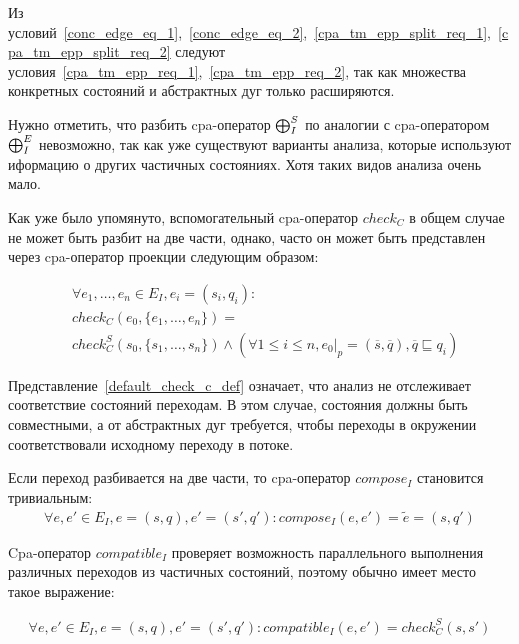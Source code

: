 Из условий~\ref{conc_edge_eq_1},~\ref{conc_edge_eq_2},~\ref{cpa_tm_epp_split_req_1},~\ref{cpa_tm_epp_split_req_2} следуют условия~\ref{cpa_tm_epp_req_1},~\ref{cpa_tm_epp_req_2}, так как множества конкретных состояний и абстрактных дуг только расширяются.

Нужно отметить, что разбить cpa-оператор $\mathrel{\bigoplus}^S_I$ по аналогии с cpa-оператором $\mathrel{\bigoplus}^E_I$ невозможно, так как уже существуют варианты анализа, которые используют иформацию о других частичных состояниях. 
Хотя таких видов анализа очень мало. 

Как уже было упомянуто, вспомогательный cpa-оператор $check_C$ в общем случае не может быть разбит на две части, однако, часто он может быть представлен через cpa-оператор проекции следующим образом: 

\begin{equation}
\label{default_check_c_def}
\begin{aligned}
& \forall e_1, \dots, e_n \in E_I, e_i=(s_i,q_i): \\
& check_C(e_0, \{e_1, \dots, e_n\}) = \\
& check^S_C(s_0, \{s_1, \dots, s_n\}) \land (\forall 1 \le i \le n, e_0|_p = (\overline{s}, \overline{q}), \overline{q} \sqsubseteq q_i)
\end{aligned}
\end{equation}

Представление~\ref{default_check_c_def} означает, что анализ не отслеживает соответствие состояний переходам. 
В этом случае, состояния должны быть совместными, а от абстрактных дуг требуется, чтобы переходы в окружении соответствовали исходному переходу в потоке. 

Если переход разбивается на две части, то cpa-оператор $compose_I$ становится тривиальным:
\begin{equation}
\label{default_compose_def}
\begin{aligned}
\forall e, e' \in E_I, e = (s, q), e' = (s', q'): compose_I(e, e') = \tilde{e} = (s, q')
\end{aligned}
\end{equation}

Cpa-оператор $compatible_I$ проверяет возможность параллельного выполнения различных переходов из частичных состояний, поэтому обычно имеет место такое выражение:

\begin{equation}
\label{default_compatible_def}
\begin{aligned}
\forall e, e' \in E_I, e = (s, q), e' = (s', q'): compatible_I(e, e') = check^S_C(s, {s'})
\end{aligned}
\end{equation}


